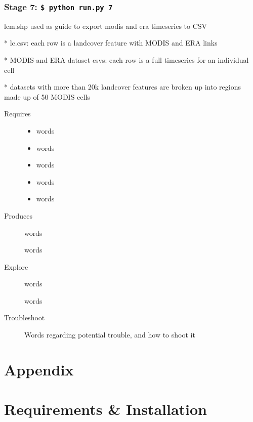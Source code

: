 \documentclass[twoside,a4paper]{refart}
\begin{document}
\subsubsection{\textbf{Stage 7:} \texttt{\$ python run.py 7}}
      lcm.shp used as guide to export modis and era timeseries to CSV
      
        * lc.csv: each row is a landcover feature with MODIS and ERA links
        
        * MODIS and ERA dataset csvs: each row is a full timeseries for an
          individual cell
          
        * datasets with more than 20k landcover features are broken up into
          regions made up of 50 MODIS cells

  \begin{description}
    \item [Requires]
      \begin{itemize}
        \item
          words
        \item
          words
        \item
          words
        \item
          words
        \item
          words

      \end{itemize}
  
  
    \item [Produces]
      words
      
      words
      

    \item [Explore]
      words
      
      words

    \item [Troubleshoot]
      Words regarding potential trouble, and how to shoot it
  \end{description}


\clearpage
\section*{Appendix}
\appendix
\section{Requirements \& Installation}
\label{setup}
\end{document}
